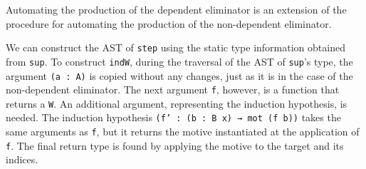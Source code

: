 \documentclass[runningheads]{llncs}
\begin{document}

Automating the production of the dependent eliminator is an extension of the procedure for automating the production of the non-dependent eliminator.

We can construct the AST of {\tt step} using the static type information obtained from {\tt sup}.
To construct \texttt{indW}, during the traversal of the AST of \texttt{sup}'s type, the argument {\tt (a : A)} is copied without any changes, just as it is in the case of the non-dependent eliminator.
The next argument {\tt f}, however, is a function that returns a \texttt{W}.
An additional argument, representing the induction hypothesis, is needed.
The induction hypothesis {\tt (f' : (b : B x) → mot (f b))} takes the same arguments as {\tt f}, but it returns the motive instantiated at the application of \texttt{f}.
The final return type is found by applying the motive to the target and its indices. %
\end{document}
